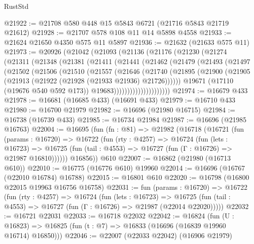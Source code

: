 \begin{lexlean}{RustStd}
\begin{coremodule}
@21922 := @21708 @580 @448 @15 @5843 @6721 (@21716 @5843 @21719 @21612)
@21928 := @21707 @578 @108 @11 @14 @5898 @4558
@21933 := @21624 @21650 @4350 @575 @11 @5897
@21936 := @21632 (@21633 @575 @11)
@21973 := @20926
    (@21042
      (@21093
        (@21136
          (@21176
            (@21230
              (@21274
                (@21311
                  (@21348
                    (@21381
                      (@21411
                        (@21441
                          (@21462
                            (@21479
                              (@21493
                                (@21497
                                  (@21502
                                    (@21506
                                      (@21510
                                        (@21557
                                          (@21646
                                            (@21740
                                              (@21895
                                                (@21900
                                                  (@21905
                                                    (@21913
                                                      (@21922 (@21928 (@21933 @21936) @21726))))))
                                              @19671
                                              (@17110 (@19676 @540 @592 @173))
                                              @19683)))))))))))))))))))))
@21974 := @16679 @433
@21978 := @16681 (@16685 @433) (@16691 @433)
@21979 := @16710 @433
@21980 := @16700 @21979
@21982 := @16696 (@21980 @16715)
@21984 := @16738 (@16739 @433)
@21985 := @16734 @21984
@21987 := @16696 (@21985 @16763)
@22004 := @16695
    (fun (fn : @81) =>
    @21982
      (@16718
        (@16721
          (fun (params : @16720) =>
          @16722
            (fun (rty : @4257) =>
            @16724
              (fun (lets : @16723) =>
              @16725 (fun (tail : @4553) => @16727 (fun (Γ : @16726) => @21987 @16810))))))
        @16856))
    @610
@22007 := @16862 (@21980 (@16713 @610))
@22010 := @16775 (@16776 @610) @19960
@22014 := @16696 (@16767 (@22010 @16784) @16788)
@22015 := @16801 @610
@22020 := @16798 (@16800 @22015 @19963 @16756 @16758)
@22031 := fun (params : @16720) =>
  @16722
    (fun (rty : @4257) =>
    @16724
      (fun (lets : @16723) =>
      @16725 (fun (tail : @4553) => @16727 (fun (Γ : @16726) => @21987 (@22014 @22020)))))
@22032 := @16721 @22031
@22033 := @16718 @22032
@22042 := @16824
    (fun (U : @16823) => @16825 (fun (t : @7) => @16833 (@16696 (@16839 @19960 @16714) @16850)))
@22046 := @22007 (@22033 @22042) (@16906 @21979)

\end{coremodule}
\end{lexlean}
